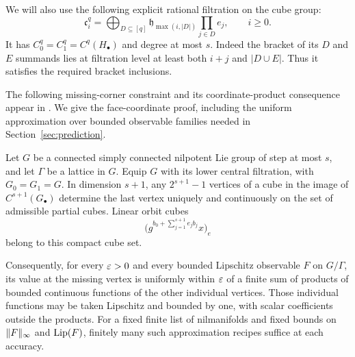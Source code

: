 We will also use the following explicit rational filtration on the cube
group:
\begin{equation}
 \mathfrak c^q_i
 =\bigoplus_{D\subseteq[q]}
   \mathfrak h_{\max(i,|D|)}\prod_{j\in D}e_j,
 \qquad i\geq0.
 \label{eq:cube-group-filtration}
\end{equation}
It has $C^q_0=C^q_1=C^q(H_\bullet)$ and degree at most $s$.
Indeed the bracket of its $D$ and $E$ summands lies at filtration level at
least both $i+j$ and $|D\cup E|$.  Thus it satisfies the required bracket
inclusions.

The following missing-corner constraint and its coordinate-product
consequence appear in \cite[Proposition~11.5, proof of
Proposition~11.2, and Appendix~E]{GreenTaoLinear}.  We give the
face-coordinate proof, including the uniform approximation over
bounded observable families needed in Section~\ref{sec:prediction}.

\begin{lemma}
\label{lem:cube-corner}
Let $G$ be a connected simply connected nilpotent Lie group of step at most
$s$, and let $\Gamma$ be a lattice in $G$. Equip $G$ with its lower central
filtration, with $G_0=G_1=G$.
In dimension $s+1$, any $2^{s+1}-1$ vertices of a cube in the image of
$C^{s+1}(G_\bullet)$ determine the last vertex uniquely and continuously
on the set of admissible partial cubes.  Linear orbit cubes
\[
 \bigl(g^{b_0+\sum_{j=1}^{s+1}e_jb_j}x\bigr)_e
\]
belong to this compact cube set.

Consequently, for every $\varepsilon>0$ and every bounded Lipschitz observable $F$
on $G/\Gamma$, its value at the missing vertex is uniformly within $\varepsilon$
of a finite sum of products of bounded continuous functions of the other
individual vertices.  Those individual functions may be taken Lipschitz
and bounded by one, with scalar coefficients outside the products.  For a
fixed finite list of nilmanifolds and fixed bounds on $\lVert F\rVert_\infty$ and
$\operatorname{Lip}(F)$, finitely many such approximation recipes suffice at each
accuracy.
\end{lemma}

